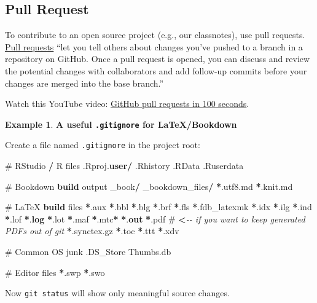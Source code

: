 \documentclass[
]{book}
\newenvironment{Shaded}{\begin{snugshade}}{\end{snugshade}}
\newcommand{\CommentTok}[1]{\textcolor[rgb]{0.56,0.35,0.01}{\textit{#1}}}
\newcommand{\FunctionTok}[1]{\textcolor[rgb]{0.13,0.29,0.53}{\textbf{#1}}}
\newcommand{\KeywordTok}[1]{\textcolor[rgb]{0.13,0.29,0.53}{\textbf{#1}}}
\newcommand{\NormalTok}[1]{#1}
\newcommand{\OperatorTok}[1]{\textcolor[rgb]{0.81,0.36,0.00}{\textbf{#1}}}
\theoremstyle{definition}
\theoremstyle{definition}
\newtheorem{example}{Example}[chapter]
\theoremstyle{definition}
\theoremstyle{definition}
\theoremstyle{remark}
\begin{document}
\subsection{Pull Request}\label{pull-request}

To contribute to an open source project (e.g., our classnotes), use pull
requests. \href{https://docs.github.com/en/pull-requests/collaborating-with-pull-requests/proposing-changes-to-your-work-with-pull-requests/about-pull-requests}{Pull requests}
``let you tell others about changes you've pushed to a branch in a repository on
GitHub. Once a pull request is opened, you can discuss and review the potential
changes with collaborators and add follow-up commits before your changes are
merged into the base branch.''

Watch this YouTube video: \href{https://youtu.be/8lGpZkjnkt4}{GitHub pull requests in 100 seconds}.

\begin{example}
\textbf{A useful \texttt{.gitignore} for LaTeX/Bookdown}

Create a file named \texttt{.gitignore} in the project root:

\begin{Shaded}
\begin{Highlighting}[]
\NormalTok{\# RStudio }\OperatorTok{/}\NormalTok{ R files}
\NormalTok{.Rproj.}\FunctionTok{user}\OperatorTok{/}
\NormalTok{.Rhistory}
\NormalTok{.RData}
\NormalTok{.Ruserdata}

\NormalTok{\# Bookdown }\KeywordTok{build}\NormalTok{ output}
\NormalTok{\_book}\OperatorTok{/}
\NormalTok{\_bookdown\_files}\OperatorTok{/}
\OperatorTok{*}\NormalTok{.utf8.md}
\OperatorTok{*}\NormalTok{.knit.md}

\NormalTok{\# LaTeX }\KeywordTok{build}\NormalTok{ files}
\OperatorTok{*}\NormalTok{.aux}
\OperatorTok{*}\NormalTok{.bbl}
\OperatorTok{*}\NormalTok{.blg}
\OperatorTok{*}\NormalTok{.brf}
\OperatorTok{*}\NormalTok{.fls}
\OperatorTok{*}\NormalTok{.fdb\_latexmk}
\OperatorTok{*}\NormalTok{.idx}
\OperatorTok{*}\NormalTok{.ilg}
\OperatorTok{*}\NormalTok{.ind}
\OperatorTok{*}\NormalTok{.lof}
\OperatorTok{*}\NormalTok{.}\FunctionTok{log}
\OperatorTok{*}\NormalTok{.lot}
\OperatorTok{*}\NormalTok{.maf}
\OperatorTok{*}\NormalTok{.mtc}\OperatorTok{*}
\OperatorTok{*}\NormalTok{.}\KeywordTok{out}
\OperatorTok{*}\NormalTok{.pdf        \# }\OperatorTok{\textless{}}\CommentTok{{-}{-} if you want to keep generated PDFs out of git}
\OperatorTok{*}\NormalTok{.synctex.gz}
\OperatorTok{*}\NormalTok{.toc}
\OperatorTok{*}\NormalTok{.ttt}
\OperatorTok{*}\NormalTok{.xdv}

\NormalTok{\# Common OS junk}
\NormalTok{.DS\_Store}
\NormalTok{Thumbs.db}

\NormalTok{\# Editor files}
\OperatorTok{*}\NormalTok{.swp}
\OperatorTok{*}\NormalTok{.swo}
\end{Highlighting}
\end{Shaded}

Now \texttt{git\ status} will show only meaningful source changes.
\end{example}
\end{document}
